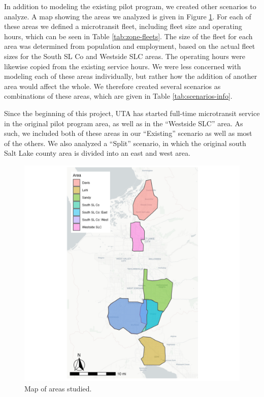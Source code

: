 \documentclass[
]{report}
\begin{document}
In addition to modeling the existing pilot program, we created other scenarios to analyze. A map showing the areas we analyzed is given in Figure \ref{fig:zone-map}. For each of these areas we defined a microtransit fleet, including fleet size and operating hours, which can be seen in Table \ref{tab:zone-fleets}. The size of the fleet for each area was determined from population and employment, based on the actual fleet sizes for the South SL Co and Westside SLC areas. The operating hours were likewise copied from the existing service hours. We were less concerned with modeling each of these areas individually, but rather how the addition of another area would affect the whole. We therefore created several scenarios as combinations of these areas, which are given in Table \ref{tab:scenarios-info}.

Since the beginning of this project, UTA has started full-time microtransit service in the original pilot program area, as well as in the ``Westside SLC'' area. As such, we included both of these areas in our ``Existing'' scenario as well as most of the others. We also analyzed a ``Split'' scenario, in which the original south Salt Lake county area is divided into an east and west area.

\begin{figure}
\includegraphics[width=29.17in]{image/areas_map} \caption{Map of areas studied.}\label{fig:zone-map}
\end{figure}
\end{document}
